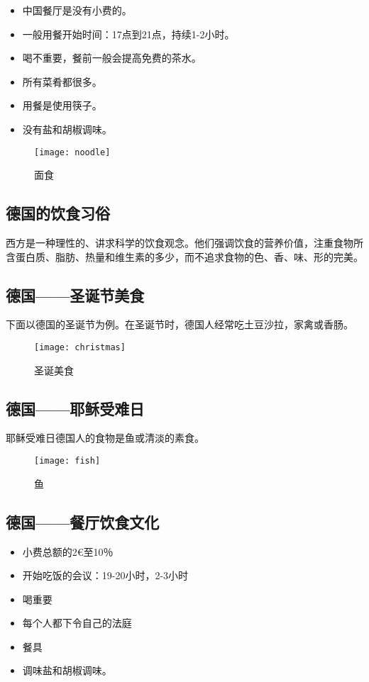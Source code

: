 \begin{itemize}
\item 中国餐厅是没有小费的。 
\item 一般用餐开始时间：17点到21点，持续1-2小时。 
\item 喝不重要，餐前一般会提高免费的茶水。 
\item 所有菜肴都很多。 
\item 用餐是使用筷子。 
\item 没有盐和胡椒调味。    
\end{itemize}

\begin{figure}[htb]
    \centering
    \texttt{[image: noodle]}
    \caption{面食}
\end{figure}

\subsection{德国的饮食习俗}
    西方是一种理性的、讲求科学的饮食观念。他们强调饮食的营养价值，注重食物所含蛋白质、脂肪、热量和维生素的多少，而不追求食物的色、香、味、形的完美。

\subsection{德国——圣诞节美食}
    下面以德国的圣诞节为例。在圣诞节时，德国人经常吃土豆沙拉，家禽或香肠。

    \begin{figure}[htb]
        \centering
        \texttt{[image: christmas]}
        \caption{圣诞美食}
    \end{figure}  

\subsection{德国——耶稣受难日}
    耶稣受难日德国人的食物是鱼或清淡的素食。 

    \begin{figure}[htb]
        \centering
        \texttt{[image: fish]}
        \caption{鱼}
    \end{figure}  

\subsection{德国——餐厅饮食文化}
\begin{itemize}
\item 小费总额的2€至10％ 
\item 开始吃饭的会议：19-20小时，2-3小时 
\item 喝重要 
\item 每个人都下令自己的法庭 
\item 餐具 
\item 调味盐和胡椒调味。    
\end{itemize}

